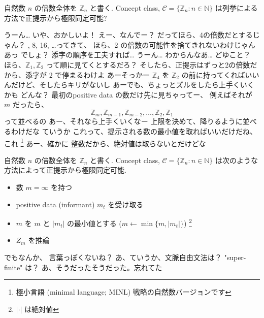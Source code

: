 \begin{boxnote}
    自然数 $n$ の倍数全体を $\mathbb{Z}_n$ と書く.
    Concept class, $\mathcal{C} = \{ \mathbb{Z}_n : n \in \mathbb{N} \}$ は列挙による方法で正提示から極限同定可能?
\end{boxnote}

\YUZUKO うーん…
\YUZUKO いや、おかしいよ！
\YUKARI えー、なんでー？
\YUZUKO だってほら、4の倍数だとするじゃん？
, 8, 16, \ldots ってきて、
\YUZUKO ほら、2 の倍数の可能性を捨てきれないわけじゃん
\YUI あっ
\YUZUKO でしょ？
\YUI 添字の順序を工夫すれば… うーん… わからんなあ…
\YUKARI どゆこと？
\YUI ほら、$\mathbb{Z}_1, \mathbb{Z}_2$ って順に見てくとするだろ？
\YUI そしたら、正提示はずっと2の倍数だから、添字が 2 で停まるわけよ
\YUKARI あーそっかー
\YUI $\mathbb{Z}_4$ を $\mathbb{Z}_2$ の前に持ってくればいいんだけど、そしたらキリがないし
\YUKARI あーでも、ちょっとズルをしたら上手くいくかも
\YUI どんな？
\YUKARI 最初のpositive data の数だけ先に見ちゃってー、
\YUKARI 例えばそれが $m$ だったら、
$$\mathbb{Z}_{m}, \mathbb{Z}_{m-1}, \mathbb{Z}_{m-2}, \ldots, \mathbb{Z}_{2}, \mathbb{Z}_{1}$$
\YUKARI って並べるの
\YUI あー、それなら上手くいくなー
\YUI 上限を決めて、降りるように並べるわけだな
\YUZUKO ていうか
\YUZUKO これって、提示される数の最小値を取ればいいだけだね、これ \footnote{極小言語 (minimal language; MINL) 戦略の自然数バージョンです}
\YUKARI あー、確かに
\YUI 整数だから、絶対値は取らないとだけどな


\begin{boxnote}
    自然数 $n$ の倍数全体を $\mathbb{Z}_n$ と書く.
    Concept class, $\mathcal{C} = \{ \mathbb{Z}_n : n \in \mathbb{N} \}$ は次のような方法によって正提示から極限同定可能.

    \begin{itemize}
        \setlength{\itemsep}{0mm}
        \item 数 $m = \infty$ を持つ
        \item positive data (informant) $m_t$ を受け取る
        \item $m$ を $m$ と $|m_t|$ の最小値とする ($m \leftarrow \min \{ m, |m_t| \}$) \footnote{$|\cdot|$ は絶対値}
        \item $Z_m$ を推論
    \end{itemize}
\end{boxnote}

\YUKARI でもなんか、
\YUKARI 言葉っぽくないね？
\YUI あ、ていうか、文脈自由文法は？ "super-finite" は？
\YUZUKO あ、そうだったそうだった。忘れてた

\PAUSE

